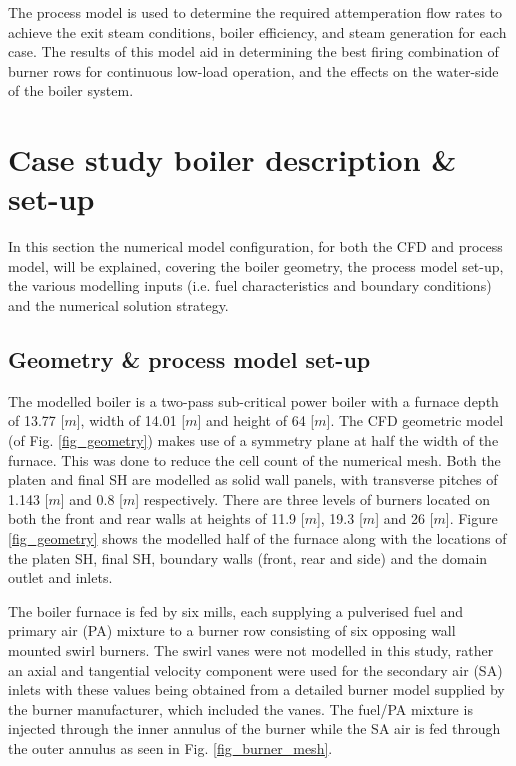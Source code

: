 \documentclass[11pt,cleanfoot]{asme2ej}
\begin{document}
The process model is used to determine the required attemperation flow rates to achieve the exit steam conditions, boiler efficiency, and steam generation for each case. The results of this model aid in determining the best firing combination of burner rows for continuous low-load operation, and the effects on the water-side of the boiler system.

\section{Case study boiler description \& set-up}
In this section the numerical model configuration, for both the CFD and process model, will be explained, covering the boiler geometry, the process model set-up, the various  modelling inputs (i.e. fuel characteristics and boundary conditions) and the numerical solution strategy.

\subsection{Geometry \& process model set-up} \label{sec_set_up}
The modelled  boiler is a two-pass sub-critical power boiler with a furnace depth of 13.77 [$m$], width of 14.01 [$m$] and height of 64 [$m$]. The CFD geometric model (of Fig. \ref{fig_geometry}) makes use of a symmetry plane at half the width of the furnace. This was done to reduce the cell count of the numerical mesh. Both the platen and final SH are modelled as solid wall panels, with transverse pitches of 1.143 [$m$] and 0.8 [$m$] respectively. There are three levels of burners located on both the front and rear walls at heights of 11.9 [$m$], 19.3 [$m$] and 26 [$m$]. Figure \ref{fig_geometry} shows the modelled half of the furnace along with the locations of the platen SH, final SH, boundary walls (front, rear and side) and the domain outlet and inlets.

The boiler furnace is fed by six mills, each supplying a pulverised fuel and primary air (PA) mixture to a burner row consisting of six opposing wall mounted swirl burners. The swirl vanes were not modelled in this study, rather an axial and tangential velocity component were used for the secondary air (SA) inlets with these values being obtained from a detailed burner model supplied by the burner manufacturer, which included the vanes. The fuel/PA mixture is injected through the inner annulus of the burner while the SA air is fed through the outer annulus as seen in Fig. \ref{fig_burner_mesh}.
\end{document}
